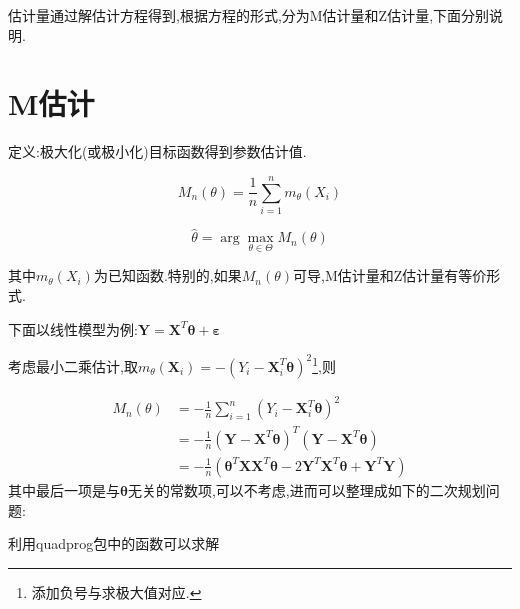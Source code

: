 \documentclass[]{ctexbook}
\newenvironment{Shaded}{\begin{snugshade}}{\end{snugshade}}
\newcommand{\DataTypeTok}[1]{\textcolor[rgb]{0.13,0.29,0.53}{#1}}
\newcommand{\DecValTok}[1]{\textcolor[rgb]{0.00,0.00,0.81}{#1}}
\newcommand{\KeywordTok}[1]{\textcolor[rgb]{0.13,0.29,0.53}{\textbf{#1}}}
\newcommand{\NormalTok}[1]{#1}
\newcommand{\OperatorTok}[1]{\textcolor[rgb]{0.81,0.36,0.00}{\textbf{#1}}}
\newcommand{\StringTok}[1]{\textcolor[rgb]{0.31,0.60,0.02}{#1}}
\begin{document}
估计量通过解估计方程得到,根据方程的形式,分为M估计量和Z估计量,下面分别说明.

\hypertarget{m}{%
\section{M估计}\label{m}}

定义:极大化(或极小化)目标函数得到参数估计值.

\[
M_{n}(\theta)=\frac{1}{n} \sum_{i=1}^{n} m_{\theta}\left(X_{i}\right)
\]

\[
\hat{\theta}=\arg \max_{\theta \in \Theta} M_{n}(\theta)
\]

其中\(m_{\theta}\left(X_{i}\right)\)为已知函数.特别的,如果\(M_n(\theta)\)可导,M估计量和Z估计量有等价形式.

下面以线性模型为例:\(\boldsymbol{Y}=\boldsymbol{X}^{T}\boldsymbol{\theta}+\boldsymbol{\varepsilon}\)

考虑最小二乘估计,取\(m_{\theta}\left(\boldsymbol{X}_{i}\right)=-\left(Y_{i}-\boldsymbol{X}_{i}^{T} \boldsymbol{\theta}\right)^{2}\)\footnote{添加负号与求极大值对应.},则

\[ 
\begin{aligned} 
M_{n}(\theta)&=-\frac{1}{n} \sum_{i=1}^{n}\left(Y_{i}-\boldsymbol{X}_{i}^{T} \boldsymbol{\theta}\right)^{2}\\
&=-\frac{1}{n}\left(\boldsymbol{Y}-\boldsymbol{X}^{T} \boldsymbol{\theta}\right)^{T}\left(\boldsymbol{Y}-\boldsymbol{X}^{T} \boldsymbol{\theta}\right)\\
&=-\frac{1}{n}\left(\boldsymbol{\theta}^{T} \boldsymbol{X} \boldsymbol{X}^{T} \boldsymbol{\theta}-2 \boldsymbol{Y}^{T} \boldsymbol{X}^{T} \boldsymbol{\theta}+\boldsymbol{Y}^{T} \boldsymbol{Y}\right)
\end{aligned} 
\]
其中最后一项是与\(\boldsymbol{\theta}\)无关的常数项,可以不考虑,进而可以整理成如下的二次规划问题:

利用quadprog包中的函数可以求解

\begin{Shaded}
\end{Shaded}
\end{document}
